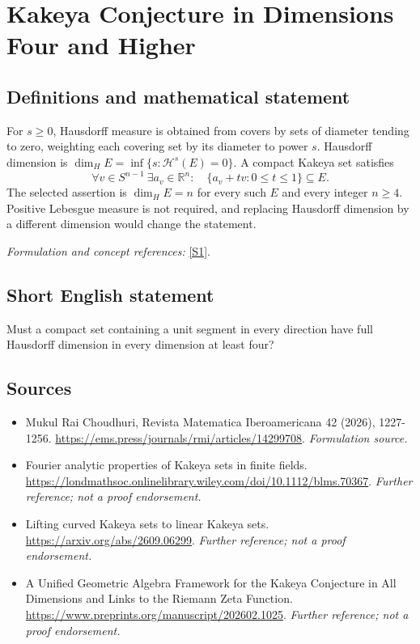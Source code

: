 \documentclass[11pt]{article}
\begin{document}
\section*{\texorpdfstring{Kakeya Conjecture in Dimensions Four and Higher}{Kakeya Conjecture in Dimensions Four and Higher}}\label{statement}
\subsection{Definitions and mathematical statement}
For $s\ge0$, Hausdorff measure is obtained from covers by sets of diameter tending to zero, weighting each covering set by its diameter to power $s$. Hausdorff dimension is $\dim_H E=\inf\{s:\mathcal H^s(E)=0\}$. A compact Kakeya set satisfies
\[
 \forall v\in S^{n-1}\ \exists a_v\in{\mathbb{R}}^n:\quad
 \{a_v+tv:0\le t\le1\}\subseteq E.
\]
The selected assertion is $\dim_H E=n$ for every such $E$ and every integer $n\ge4$. Positive Lebesgue measure is not required, and replacing Hausdorff dimension by a different dimension would change the statement.
\par\smallskip\textit{Formulation and concept references:} \href{https://ems.press/journals/rmi/articles/14299708}{[S1]}.

\subsection{Short English statement}
Must a compact set containing a unit segment in every direction have full Hausdorff dimension in every dimension at least four?
\subsection{Sources}
\begin{itemize}
\item[S1]Mukul Rai Choudhuri, Revista Matematica Iberoamericana 42 (2026), 1227-1256.
\url{https://ems.press/journals/rmi/articles/14299708}.
\textit{Formulation source.}
\item[S2]Fourier analytic properties of Kakeya sets in finite fields.
\url{https://londmathsoc.onlinelibrary.wiley.com/doi/10.1112/blms.70367}.
\textit{Further reference; not a proof endorsement.}
\item[S3]Lifting curved Kakeya sets to linear Kakeya sets.
\url{https://arxiv.org/abs/2609.06299}.
\textit{Further reference; not a proof endorsement.}
\item[S4]A Unified Geometric Algebra Framework for the Kakeya Conjecture in All Dimensions and Links to the Riemann Zeta Function.
\url{https://www.preprints.org/manuscript/202602.1025}.
\textit{Further reference; not a proof endorsement.}
\end{itemize}
\end{document}
